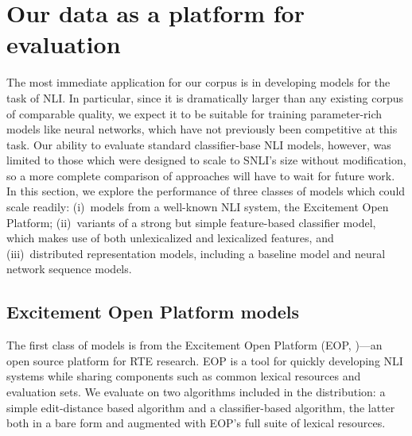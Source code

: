 \section{Our data as a platform for evaluation}

The most immediate application for our corpus is in developing models for the task of NLI\@. In particular, since it is dramatically larger than any existing corpus of comparable quality, we expect it to be suitable for training parameter-rich models like neural networks, which have not previously been competitive at this task. Our ability to evaluate standard classifier-base NLI models, however, was limited to those which were designed to scale to SNLI's size without modification, so a more complete comparison of approaches will have to wait for future work. In this section, we explore the performance of three classes of models which could scale readily: (i)~models from a well-known NLI system, the Excitement Open Platform; (ii)~variants of a strong but simple feature-based classifier model, which makes use of both unlexicalized and lexicalized features, and (iii)~distributed representation models, including a baseline model and neural network sequence models.

%
%

\subsection{Excitement Open Platform models}

The first class of models is from the Excitement Open
  Platform (EOP,
  \citealt{pado2014design,magnini2014excitement})---an open source platform for RTE research.
%
EOP is a tool for quickly developing NLI systems
  while sharing components such as common lexical resources and 
  evaluation sets.
We evaluate on two algorithms included in the distribution:
  a simple edit-distance based algorithm and
  a classifier-based algorithm, the latter both in a bare form and augmented 
  with EOP's full suite of lexical resources.

